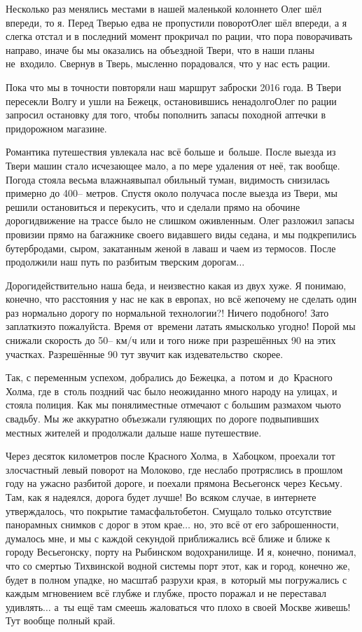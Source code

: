 Несколько раз менялись местами в нашей маленькой колонне\mdash то Олег шёл впереди, то я. Перед Тверью едва не пропустили поворот\mdash Олег шёл впереди, а я слегка отстал и в последний момент прокричал по рации, что пора поворачивать направо, иначе бы мы оказались на объездной Твери, что в наши планы не~входило. Свернув в Тверь, мысленно порадовался, что у нас есть рации.

Пока что мы в точности повторяли наш маршрут заброски 2016 года. В Твери пересекли Волгу и ушли на Бежецк, остановившись ненадолго\mdash Олег по рации запросил остановку для того, чтобы пополнить запасы походной аптечки в придорожном магазине. 

Романтика путешествия увлекала нас всё больше и~больше. После выезда из Твери машин стало исчезающее мало, а по мере удаления от неё, так вообще. Погода стояла весьма влажная\mdash выпал обильный туман, видимость снизилась примерно до 400\thinspace\nobreakdash-- метров. Спустя около получаса после выезда из Твери, мы решили остановиться и перекусить, что и сделали прямо на обочине дороги\mdash движение на трассе было не слишком оживленным. Олег разложил запасы провизии прямо на багажнике своего видавшего виды седана, и мы подкрепились бутербродами, сыром, закатанным женой в лаваш и чаем из термосов. После продолжили наш путь по разбитым тверским дорогам$\ldots$

Дороги\mdash действительно наша беда, и неизвестно какая из двух хуже. Я понимаю, конечно, что расстояния у нас не как в европах, но всё же\mdash почему не сделать один раз нормально дорогу по нормальной технологии?! Ничего подобного! Зато заплатки\mdash это пожалуйста. Время от~времени латать ямы\mdash сколько угодно! Порой мы снижали скорость до 50\thinspace\nobreakdash-- км/ч или и того ниже при разрешённых 90 на этих участках. Разрешённые 90 тут звучит как издевательство~скорее. 

Так, с переменным успехом, добрались до Бежецка, а~потом и~до~Красного Холма, где в~столь поздний час было неожиданно много народу на улицах, и стояла полиция. Как мы поняли\mdash местные отмечают с большим размахом чью\sdash то свадьбу. Мы же аккуратно объезжали гуляющих по дороге подвыпивших местных жителей и продолжали дальше наше путешествие. 

Через десяток километров после Красного Холма, в~Хабоцком, проехали тот злосчастный левый поворот на Молоково, где неслабо протряслись в прошлом году на ужасно разбитой дороге, и поехали прямо\mdash на Весьегонск через Кесьму. Там, как я надеялся, дорога будет лучше! Во всяком случае, в интернете утверждалось, что покрытие там\mdash асфальтобетон. Смущало только отсутствие панорамных снимков с дорог в этом крае$\ldots$ но, это всё от его заброшенности, думалось мне, и мы с каждой секундой приближались всё ближе и ближе к городу Весьегонску, порту на Рыбинском водохранилище. И я, конечно, понимал, что со смертью Тихвинской водной системы порт этот, как и город, конечно же, будет в полном упадке, но масштаб разрухи края, в~который мы погружались с каждым мгновением всё глубже и глубже, просто поражал и не переставал удивлять$\ldots$ а~ты ещё там смеешь жаловаться что плохо в своей Москве живешь! Тут вообще полный край. 

